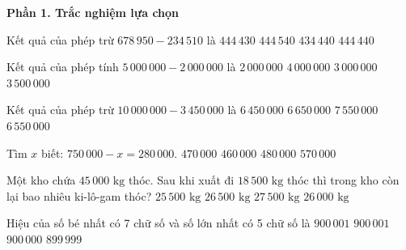\textbf{Phần 1. Trắc nghiệm lựa chọn}

\begin{ex} %
Kết quả của phép trừ $678\,950 - 234\,510$ là
\choice
{$444\,430$}
{$444\,540$}
{$434\,440$}
{\True $444\,440$}
\end{ex}

\begin{ex} %
Kết quả của phép tính $5\,000\,000 - 2\,000\,000$ là
\choice
{$2\,000\,000$}
{$4\,000\,000$}
{\True $3\,000\,000$}
{$3\,500\,000$}
\end{ex}

\begin{ex} %
Kết quả của phép trừ $10\,000\,000 - 3\,450\,000$ là
\choice
{$6\,450\,000$}
{$6\,650\,000$}
{$7\,550\,000$}
{\True $6\,550\,000$}
\end{ex}

\begin{ex} %
Tìm $x$ biết: $750\,000 - x = 280\,000$.
\choice
{\True $470\,000$}
{$460\,000$}
{$480\,000$}
{$570\,000$}
\end{ex}

\begin{ex} %
Một kho chứa $45\,000\text{ kg}$ thóc. Sau khi xuất đi $18\,500\text{ kg}$ thóc thì trong kho còn lại bao nhiêu ki-lô-gam thóc?
\choice
{$25\,500\text{ kg}$}
{\True $26\,500\text{ kg}$}
{$27\,500\text{ kg}$}
{$26\,000\text{ kg}$}
\end{ex}

\begin{ex} %
Hiệu của số bé nhất có 7 chữ số và số lớn nhất có 5 chữ số là
\choice
{\True $900\,001$}
{$900\,001$}
{$900\,000$}
{$899\,999$}
\end{ex}

